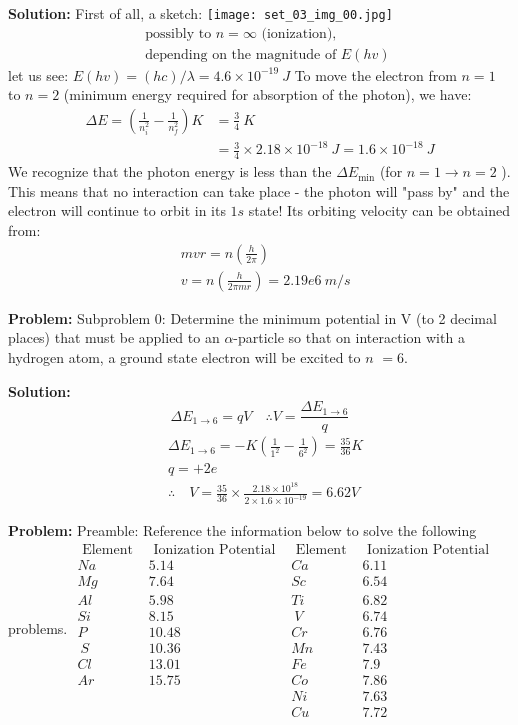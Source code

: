 \documentclass[10pt]{article}
\begin{document}
\textbf{Solution:}
First of all, a sketch:
\texttt{[image: set\_03\_img\_00.jpg]}
\nonessentialimage
\[
\begin{aligned}
&\text { possibly to } {n}=\infty \text { (ionization), } \\
&\text { depending on the magnitude of } E(h v)
\end{aligned}
\]
let us see: $E(h v)=(h c) / \lambda=4.6 \times 10^{-19} {~J}$
To move the electron from $n=1$ to $n=2$ (minimum energy required for absorption of the photon), we have:
\[
\begin{aligned}
\Delta {E}=\left(\frac{1}{{n}_{{i}}^{2}}-\frac{1}{{n}_{{f}}^{2}}\right) {K} &=\frac{3}{4} {~K} \\
&=\frac{3}{4} \times 2.18 \times 10^{-18} {~J}=1.6 \times 10^{-18} {~J}
\end{aligned}
\]
We recognize that the photon energy is less than the $\Delta E_{\min }$ (for $n=1 \rightarrow n=2$ ).
This means that no interaction can take place - the photon will "pass by" and the electron will continue to orbit in its $1 s$ state! Its orbiting velocity can be obtained from:
\[
\begin{aligned}
&m v r=n\left(\frac{h}{2 \pi}\right) \\
&v=n\left(\frac{h}{2 \pi m r}\right)= \boxed{2.19e6} {~m} / {s}
\end{aligned}
\]


\textbf{Problem:}
Subproblem 0: Determine the minimum potential in V (to 2 decimal places) that must be applied to an $\alpha$-particle so that on interaction with a hydrogen atom, a ground state electron will be excited to $n$ $=6$.


\textbf{Solution:}
\[
\Delta {E}_{1 \rightarrow 6}={qV} \quad \therefore {V}=\frac{\Delta {E}_{1 \rightarrow 6}}{{q}}
\]
\[
\begin{aligned}
& \Delta {E}_{1 \rightarrow 6}=-{K}\left(\frac{1}{1^{2}}-\frac{1}{6^{2}}\right)=\frac{35}{36} {K} \\
& {q}=+2 {e} \\
& \therefore \quad V=\frac{35}{36} \times \frac{2.18 \times 10^{18}}{2 \times 1.6 \times 10^{-19}}=\boxed{6.62} V 
\end{aligned}
\]


\textbf{Problem:}
Preamble: Reference the information below to solve the following problems. 
$\begin{array}{llll}\text { Element } & \text { Ionization Potential }  & \text { Element } & \text { Ionization Potential } \\ {Na} & 5.14 & {Ca} & 6.11 \\ {Mg} & 7.64 & {Sc} & 6.54 \\ {Al} & 5.98 & {Ti} & 6.82 \\ {Si} & 8.15 & {~V} & 6.74 \\ {P} & 10.48 & {Cr} & 6.76 \\ {~S} & 10.36 & {Mn} & 7.43 \\ {Cl} & 13.01 & {Fe} & 7.9 \\ {Ar} & 15.75 & {Co} & 7.86 \\ & & {Ni} & 7.63 \\ & & {Cu} & 7.72\end{array}$
\end{document}
